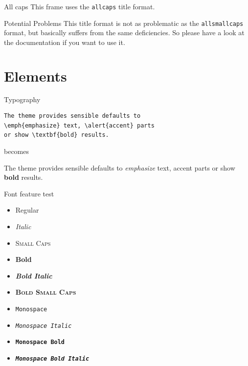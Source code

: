\documentclass[10pt]{beamer}
\begin{document}
{
\begin{frame}{All caps}
	This frame uses the \texttt{allcaps} title format.

	\begin{alertblock}{Potential Problems}
		This title format is not as problematic as the \texttt{allsmallcaps} format, but basically suffers from the same deficiencies. So please have a look at the documentation if you want to use it.
	\end{alertblock}
\end{frame}
}

\section{Elements}

\begin{frame}[fragile]{Typography}
      \begin{verbatim}The theme provides sensible defaults to
\emph{emphasize} text, \alert{accent} parts
or show \textbf{bold} results.\end{verbatim}

  \begin{center}becomes\end{center}

  The theme provides sensible defaults to \emph{emphasize} text,
  \alert{accent} parts or show \textbf{bold} results.
\end{frame}

\begin{frame}{Font feature test}
  \begin{itemize}
    \item Regular
    \item \textit{Italic}
    \item \textsc{Small Caps}
    \item \textbf{Bold}
    \item \textbf{\textit{Bold Italic}}
    \item \textbf{\textsc{Bold Small Caps}}
    \item \texttt{Monospace}
    \item \texttt{\textit{Monospace Italic}}
    \item \texttt{\textbf{Monospace Bold}}
    \item \texttt{\textbf{\textit{Monospace Bold Italic}}}
  \end{itemize}
\end{frame}
\end{document}
